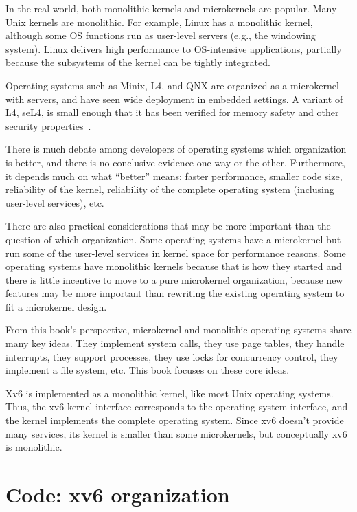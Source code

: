 In the real world, both monolithic kernels and microkernels are
popular. Many
Unix kernels are monolithic. For example, Linux has a monolithic kernel,
although some OS functions run as user-level servers (e.g., the windowing
system).  Linux delivers high performance to OS-intensive applications, partially
because the subsystems of the kernel can be tightly integrated.

Operating systems such as Minix, L4, and QNX are organized as a microkernel with
servers, and have seen wide deployment in embedded settings.  A
variant of L4, seL4, is small enough that it has been verified for
memory safety and other security properties~\cite{sel4}.

There is much debate among developers of operating systems which
organization is better, and there is no conclusive evidence one way or
the other.  Furthermore, it depends much on what ``better'' means:
faster performance, smaller code size, reliability of the kernel,
reliability of the complete operating system (inclusing user-level
services), etc.

There are also practical considerations that may be more important
than the question of which organization.  Some operating systems
have a microkernel but run some of the user-level services in kernel
space for performance reasons.  Some operating systems have monolithic
kernels because that is how they started and there is little incentive
to move to a pure microkernel organization, because new features may
be more important than rewriting the existing operating system to fit a microkernel
design.

From this book's perspective, microkernel and monolithic operating
systems share many key ideas.  They implement system calls, they use
page tables, they handle interrupts, they support processes, they use
locks for concurrency control, they implement a file system,
etc. This book focuses on these core ideas.

Xv6 is
implemented as a monolithic kernel, like most Unix operating systems.
Thus, the xv6 kernel interface corresponds to the operating system
interface, and the kernel implements the complete operating system.  Since 
xv6 doesn't provide many services, its kernel is smaller than some
microkernels, but conceptually xv6 is monolithic.  

\section{Code: xv6 organization}

